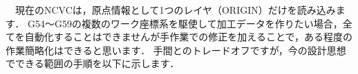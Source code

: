

\vspace*{1zh}
　現在のNCVCは，原点情報として1つのレイヤ（ORIGIN）だけを読み込みます．
G54～G59の複数のワーク座標系を駆使して加工データを作りたい場合，全てを自動化することはできませんが手作業での修正を加えることで，ある程度の作業簡略化はできると思います．
手間とのトレードオフですが，今の設計思想でできる範囲の手順を以下に示します．

